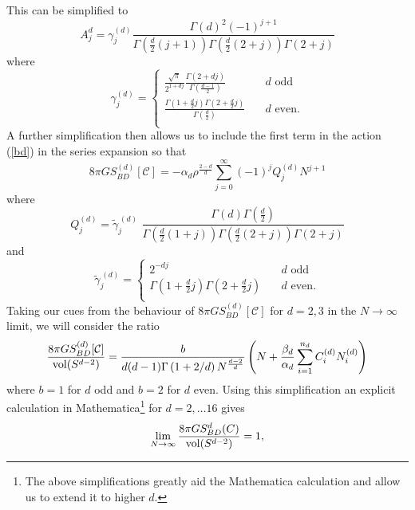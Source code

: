 \documentclass[12pt]{article}
\begin{document}
This can be simplified to 
\begin{equation}
A_j^d= \gamma_j^{ (d)}   \frac{\Gamma\left (d\right)^2 (-1)^{j+1}}{\Gamma\left (\frac{d}{2} (j + 1)\right) \Gamma\left (\frac{d}{2} (2 + j)\right) \Gamma\left (2 + j\right) }
\label{simplercoefft} 
\end{equation} 
where 
\begin{equation} \gamma_j^{ (d)}= 
\begin{cases} 
\displaystyle\frac{\sqrt{\pi}}{2^{1+dj} }\frac{\Gamma\left (2+dj\right)}{\Gamma\left (\frac{d-1}{2}\right)}    \quad   & d \, \, \mathrm{odd} \\
\displaystyle\frac{\Gamma\left (1+\frac{d}{2}j\right)  \Gamma\left (2+\frac{d}{2}j\right) }{\Gamma\left (\frac{d}{2}\right)}  \quad  & d\mathrm{ \, \,  even.} \\
\end{cases} 
\end{equation} 
A further simplification then allows us to include the first term in the action (\ref{bd}) in the series expansion so that 
\begin{equation} 
8 \pi G S_{BD}^{ (d)}[\mathcal C] = -\alpha_d \rho^{\frac{2-d}{d}} \sum_{j=0}^\infty (-1)^j Q_j^{ (d)} N^{j+1} 
\end{equation}
where 
\begin{equation} 
Q_j^{ (d)}  = {\widetilde \gamma}_j^{\, (d)} \, \, \frac{\Gamma\left (d\right)\Gamma\left (\frac{d}{2}\right)}{\Gamma\left (\frac{d}{2} (1+j)\right) \Gamma\left (\frac{d}{2} (2+j)\right) \Gamma\left (2+j\right)}
\label{fullcoefft} \end{equation}
and
\begin{equation}
{\widetilde \gamma}_j^{\, (d)} = 
\begin{cases} 
2^{-dj}    \quad   &{d} \, \, \mathrm{odd} \\
\Gamma\left (1+\frac{d}{2}j\right) \Gamma\left (2+\frac{d}{2}j\right)   \quad   &d\mathrm{ \, \,  even.} \\
\end{cases} 
\end{equation} 
Taking our cues from the behaviour of $8 \pi G S_{BD}^{ (d)}[\mathcal C]$ for $d=2,3$ in the  $N \rightarrow \infty$ limit,  we will consider the ratio
\begin{equation} 
\frac{ 8 \pi G S_{BD}^{ (d)}[\mathcal C]}{\mathrm{vol} (S^{d-2})} = \frac{b}{d (d-1) \Gamma\left (1+2/d\right) N^{\frac{d-2}{d}}} \left ( N + \frac{\beta_d}{\alpha_d} \sum_{i=1}^{n_d} C_i^{ (d)} N_i^{ (d)} \right)  
\label{ratio} 
\end{equation} 
where $b=1$ for $d$ odd and $b=2$ for $d$ even.
Using this simplification an explicit calculation in Mathematica\footnote{The above simplifications greatly aid the Mathematica calculation and allow us to extend it to higher $d$.}  for $d=2, \ldots 16$ gives 
\begin{equation} 
\lim_{N \rightarrow \infty} \frac{ 8 \pi G S_{BD}^d (C)}{\mathrm{vol} (S^{d-2})} = 1,  
\label{result} 
\end{equation} 
\end{document}
